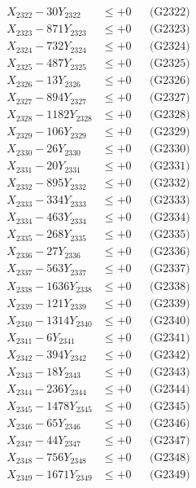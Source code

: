 \documentclass[a4paper,10pt]{article}
\begin{document}
{\begin{align}
X_{2322} - 30Y_{2322} &\leq +0 && \text{(G2322)} \\
X_{2323} - 871Y_{2323} &\leq +0 && \text{(G2323)} \\
X_{2324} - 732Y_{2324} &\leq +0 && \text{(G2324)} \\
X_{2325} - 487Y_{2325} &\leq +0 && \text{(G2325)} \\
X_{2326} - 13Y_{2326} &\leq +0 && \text{(G2326)} \\
X_{2327} - 894Y_{2327} &\leq +0 && \text{(G2327)} \\
X_{2328} - 1182Y_{2328} &\leq +0 && \text{(G2328)} \\
X_{2329} - 106Y_{2329} &\leq +0 && \text{(G2329)} \\
X_{2330} - 26Y_{2330} &\leq +0 && \text{(G2330)} \\
\allowbreak
X_{2331} - 20Y_{2331} &\leq +0 && \text{(G2331)} \\
X_{2332} - 895Y_{2332} &\leq +0 && \text{(G2332)} \\
X_{2333} - 334Y_{2333} &\leq +0 && \text{(G2333)} \\
X_{2334} - 463Y_{2334} &\leq +0 && \text{(G2334)} \\
X_{2335} - 268Y_{2335} &\leq +0 && \text{(G2335)} \\
X_{2336} - 27Y_{2336} &\leq +0 && \text{(G2336)} \\
X_{2337} - 563Y_{2337} &\leq +0 && \text{(G2337)} \\
X_{2338} - 1636Y_{2338} &\leq +0 && \text{(G2338)} \\
X_{2339} - 121Y_{2339} &\leq +0 && \text{(G2339)} \\
X_{2340} - 1314Y_{2340} &\leq +0 && \text{(G2340)} \\
\allowbreak
X_{2341} - 6Y_{2341} &\leq +0 && \text{(G2341)} \\
X_{2342} - 394Y_{2342} &\leq +0 && \text{(G2342)} \\
X_{2343} - 18Y_{2343} &\leq +0 && \text{(G2343)} \\
X_{2344} - 236Y_{2344} &\leq +0 && \text{(G2344)} \\
X_{2345} - 1478Y_{2345} &\leq +0 && \text{(G2345)} \\
X_{2346} - 65Y_{2346} &\leq +0 && \text{(G2346)} \\
X_{2347} - 44Y_{2347} &\leq +0 && \text{(G2347)} \\
X_{2348} - 756Y_{2348} &\leq +0 && \text{(G2348)} \\
X_{2349} - 1671Y_{2349} &\leq +0 && \text{(G2349)} \\

\end{align}}
\end{document}
